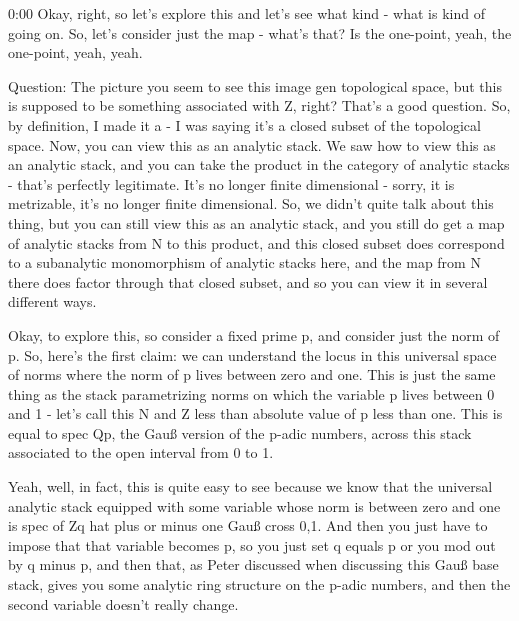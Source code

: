 \begin{unfinished}{0:00}
Okay, right, so let's explore this and let's see what kind - what is kind of going on. So, let's consider just the map - what's that? Is the one-point, yeah, the one-point, yeah, yeah.

Question: The picture you seem to see this image gen topological space, but this is supposed to be something associated with Z, right? That's a good question. So, by definition, I made it a - I was saying it's a closed subset of the topological space. Now, you can view this as an analytic stack. We saw how to view this as an analytic stack, and you can take the product in the category of analytic stacks - that's perfectly legitimate. It's no longer finite dimensional - sorry, it is metrizable, it's no longer finite dimensional. So, we didn't quite talk about this thing, but you can still view this as an analytic stack, and you still do get a map of analytic stacks from N to this product, and this closed subset does correspond to a subanalytic monomorphism of analytic stacks here, and the map from N there does factor through that closed subset, and so you can view it in several different ways.

Okay, to explore this, so consider a fixed prime p, and consider just the norm of p. So, here's the first claim: we can understand the locus in this universal space of norms where the norm of p lives between zero and one. This is just the same thing as the stack parametrizing norms on which the variable p lives between 0 and 1 - let's call this N and Z less than absolute value of p less than one. This is equal to spec Qp, the Gauß version of the p-adic numbers, across this stack associated to the open interval from 0 to 1.

Yeah, well, in fact, this is quite easy to see because we know that the universal analytic stack equipped with some variable whose norm is between zero and one is spec of Zq hat plus or minus one Gauß cross 0,1. And then you just have to impose that that variable becomes p, so you just set q equals p or you mod out by q minus p, and then that, as Peter discussed when discussing this Gauß base stack, gives you some analytic ring structure on the p-adic numbers, and then the second variable doesn't really change.


\end{unfinished}
